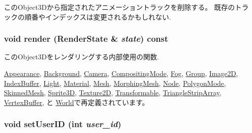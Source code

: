 このObject3Dから指定されたアニメーショントラックを削除する。 既存のトラックの順番やインデックスは変更されるかもしれない. \hypertarget{classm3g_1_1Object3D_8babc8a79b78615da51161e94029eea9}{
\subsubsection[{render}]{\setlength{\rightskip}{0pt plus 5cm}void render ({\bf RenderState} \& {\em state}) const}}
\label{classm3g_1_1Object3D_8babc8a79b78615da51161e94029eea9}


このObject3Dをレンダリングする内部使用の関数. 

\hyperlink{classm3g_1_1Appearance_8babc8a79b78615da51161e94029eea9}{Appearance}, \hyperlink{classm3g_1_1Background_8babc8a79b78615da51161e94029eea9}{Background}, \hyperlink{classm3g_1_1Camera_8babc8a79b78615da51161e94029eea9}{Camera}, \hyperlink{classm3g_1_1CompositingMode_8babc8a79b78615da51161e94029eea9}{CompositingMode}, \hyperlink{classm3g_1_1Fog_8babc8a79b78615da51161e94029eea9}{Fog}, \hyperlink{classm3g_1_1Group_8babc8a79b78615da51161e94029eea9}{Group}, \hyperlink{classm3g_1_1Image2D_8babc8a79b78615da51161e94029eea9}{Image2D}, \hyperlink{classm3g_1_1IndexBuffer_8babc8a79b78615da51161e94029eea9}{IndexBuffer}, \hyperlink{classm3g_1_1Light_8babc8a79b78615da51161e94029eea9}{Light}, \hyperlink{classm3g_1_1Material_8babc8a79b78615da51161e94029eea9}{Material}, \hyperlink{classm3g_1_1Mesh_8babc8a79b78615da51161e94029eea9}{Mesh}, \hyperlink{classm3g_1_1MorphingMesh_8babc8a79b78615da51161e94029eea9}{MorphingMesh}, \hyperlink{classm3g_1_1Node_8babc8a79b78615da51161e94029eea9}{Node}, \hyperlink{classm3g_1_1PolygonMode_8babc8a79b78615da51161e94029eea9}{PolygonMode}, \hyperlink{classm3g_1_1SkinnedMesh_8babc8a79b78615da51161e94029eea9}{SkinnedMesh}, \hyperlink{classm3g_1_1Sprite3D_8babc8a79b78615da51161e94029eea9}{Sprite3D}, \hyperlink{classm3g_1_1Texture2D_8babc8a79b78615da51161e94029eea9}{Texture2D}, \hyperlink{classm3g_1_1Transformable_8babc8a79b78615da51161e94029eea9}{Transformable}, \hyperlink{classm3g_1_1TriangleStripArray_8babc8a79b78615da51161e94029eea9}{TriangleStripArray}, \hyperlink{classm3g_1_1VertexBuffer_8babc8a79b78615da51161e94029eea9}{VertexBuffer}, と \hyperlink{classm3g_1_1World_8babc8a79b78615da51161e94029eea9}{World}で再定義されています。\hypertarget{classm3g_1_1Object3D_8eaa86665b4ca2c39691b6efc50108ee}{
\subsubsection[{setUserID}]{\setlength{\rightskip}{0pt plus 5cm}void setUserID (int {\em user\_\-id})}}
\label{classm3g_1_1Object3D_8eaa86665b4ca2c39691b6efc50108ee}


